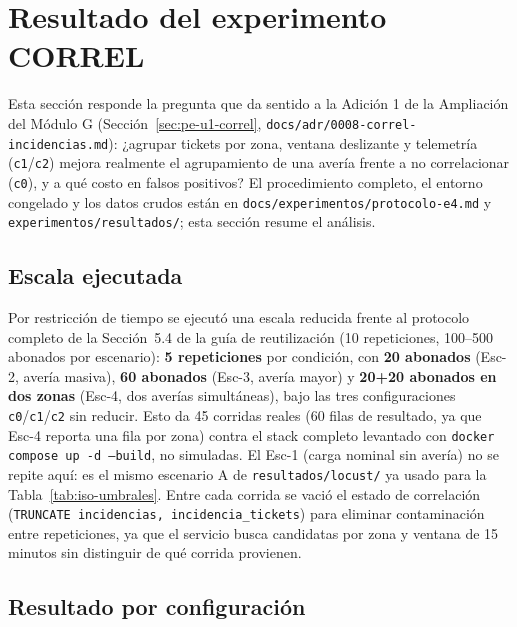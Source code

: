 \section{Resultado del experimento CORREL}
\label{sec:resultado-correl}

Esta sección responde la pregunta que da sentido a la Adición 1 de la Ampliación del Módulo G
(Sección~\ref{sec:pe-u1-correl}, \texttt{docs/adr/0008-correl-incidencias.md}): ¿agrupar tickets
por zona, ventana deslizante y telemetría (\texttt{c1}/\texttt{c2}) mejora realmente el
agrupamiento de una avería frente a no correlacionar (\texttt{c0}), y a qué costo en falsos
positivos? El procedimiento completo, el entorno congelado y los datos crudos están en
\texttt{docs/experimentos/protocolo-e4.md} y \texttt{experimentos/resultados/}; esta sección resume
el análisis.

\subsection{Escala ejecutada}

Por restricción de tiempo se ejecutó una escala reducida frente al protocolo completo de la
Sección~5.4 de la guía de reutilización (10 repeticiones, 100--500 abonados por escenario):
\textbf{5 repeticiones} por condición, con \textbf{20 abonados} (Esc-2, avería masiva),
\textbf{60 abonados} (Esc-3, avería mayor) y \textbf{20+20 abonados en dos zonas} (Esc-4, dos
averías simultáneas), bajo las tres configuraciones \texttt{c0}/\texttt{c1}/\texttt{c2} sin
reducir. Esto da 45 corridas reales (60 filas de resultado, ya que Esc-4 reporta una fila por
zona) contra el stack completo levantado con \texttt{docker compose up -d --build}, no
simuladas. El Esc-1 (carga nominal sin avería) no se repite aquí: es el mismo escenario A de
\texttt{resultados/locust/} ya usado para la Tabla~\ref{tab:iso-umbrales}. Entre
cada corrida se vació el estado de correlación (\texttt{TRUNCATE incidencias,
incidencia\_tickets}) para eliminar contaminación entre repeticiones, ya que el servicio busca
candidatas por zona y ventana de 15 minutos sin distinguir de qué corrida provienen.

\subsection{Resultado por configuración}



